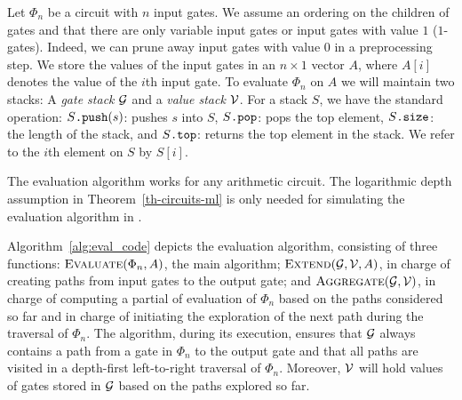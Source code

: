 Let $\Phi_n$ be a circuit with $n$ input gates. We assume an ordering on the children of gates and that there are only variable input gates or input gates with value $1$ ($1$-gates). Indeed, we can prune away input gates with value $0$ in a preprocessing step. We store the values of the input gates in an $n\times 1$ vector $A$, where $A[i]$ denotes the value
of the $i$th input gate. To evaluate $\Phi_n$ on $A$ we will maintain two stacks: A \textit{gate stack}
 $\mathcal{G}$ and a \textit{value stack} $\mathcal{V}$. For a stack $S$, we have the standard operation: $S\texttt{.push}(s)$: pushes $s$ into $S$,
$S\texttt{.pop}$: pops the top element,  $S\texttt{.size}$: the length of the stack, and
$S\texttt{.top}$: returns the top element in the stack. We refer to the $i$th element on $S$ by $S[i]$.

The evaluation algorithm works for any arithmetic circuit. The logarithmic depth assumption in Theorem~\ref{th-circuits-ml} is only needed for simulating the evaluation algorithm in \langfor.

Algorithm~\ref{alg:eval_code} depicts the evaluation algorithm, consisting of three functions:
$\textsc{Evaluate}(\Phi_n,A)$, the main algorithm; $\textsc{Extend}(\mathcal{G},\mathcal{V},A)$, in charge of creating paths from input gates to the output gate; and $\textsc{Aggregate}(\mathcal{G},\mathcal{V})$, in charge of computing a partial of evaluation of $\Phi_n$ based on the paths considered so far and in charge of initiating the exploration of the next path during the traversal of $\Phi_n$.
The algorithm, during its execution, ensures that 
$\mathcal{G}$ always contains a path from a gate in $\Phi_n$ to the output gate and that all paths are visited in a depth-first left-to-right traversal of $\Phi_n$. Moreover, $\mathcal{V}$ will hold values of gates stored in $\mathcal{G}$ based on the paths explored so far.


